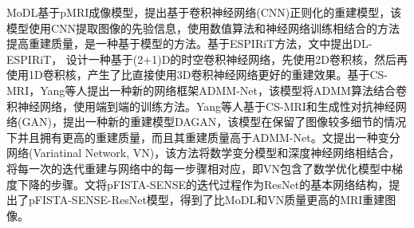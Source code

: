 \documentclass[UTF8]{article}
\begin{document}
\par MoDL\cite{aggarwal2018modl}基于pMRI成像模型，提出基于卷积神经网络(CNN)正则化的重建模型，该模型使用CNN提取图像的先验信息，使用数值算法和神经网络训练相结合的方法提高重建质量，是一种基于模型的方法。基于ESPIRiT方法，文\cite{sandino2021accelerating}中提出DL-ESPIRiT， 设计一种基于(2+1)D的时空卷积神经网络，先使用2D卷积核，然后再使用1D卷积核，产生了比直接使用3D卷积神经网络更好的重建效果。基于CS-MRI，Yang等人提出一种新的网络框架ADMM-Net\cite{yang2016deep}，该模型将ADMM算法结合卷积神经网络，使用端到端的训练方法。Yang等人基于CS-MRI和生成性对抗神经网络(GAN)，提出一种新的重建模型DAGAN\cite{yang2017dagan}，该模型在保留了图像较多细节的情况下并且拥有更高的重建质量，而且其重建质量高于ADMM-Net。文\cite{hammernik2018learning}提出一种变分网络(Variatinal Network, VN)，该方法将数学变分模型和深度神经网络相结合，将每一次的迭代重建与网络中的每一步骤相对应，即VN包含了数学优化模型中梯度下降的步骤。文\cite{LU2020106790}将pFISTA-SENSE的迭代过程作为ResNet的基本网络结构，提出了pFISTA-SENSE-ResNet模型，得到了比MoDL和VN质量更高的MRI重建图像。
\end{document}
